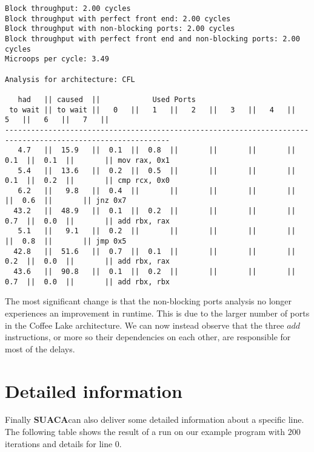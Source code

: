 \documentclass[a4paper,12pt,titlepage, twoside]{report}
\newcommand{\suaca}{\textbf{SUACA}}
\begin{document}
\begin{Verbatim}[fontsize=\scriptsize]
Block throughput: 2.00 cycles
Block throughput with perfect front end: 2.00 cycles
Block throughput with non-blocking ports: 2.00 cycles
Block throughput with perfect front end and non-blocking ports: 2.00 cycles
Microops per cycle: 3.49

Analysis for architecture: CFL

   had   || caused  ||            Used Ports
 to wait || to wait ||   0   ||   1   ||   2   ||   3   ||   4   ||   5   ||   6   ||   7   ||
------------------------------------------------------------------------------------------------------------
   4.7   ||  15.9   ||  0.1  ||  0.8  ||       ||       ||       ||  0.1  ||  0.1  ||       || mov rax, 0x1
   5.4   ||  13.6   ||  0.2  ||  0.5  ||       ||       ||       ||  0.1  ||  0.2  ||       || cmp rcx, 0x0
   6.2   ||   9.8   ||  0.4  ||       ||       ||       ||       ||       ||  0.6  ||       || jnz 0x7
  43.2   ||  48.9   ||  0.1  ||  0.2  ||       ||       ||       ||  0.7  ||  0.0  ||       || add rbx, rax
   5.1   ||   9.1   ||  0.2  ||       ||       ||       ||       ||       ||  0.8  ||       || jmp 0x5
  42.8   ||  51.6   ||  0.7  ||  0.1  ||       ||       ||       ||  0.2  ||  0.0  ||       || add rbx, rax
  43.6   ||  90.8   ||  0.1  ||  0.2  ||       ||       ||       ||  0.7  ||  0.0  ||       || add rbx, rbx
\end{Verbatim}

The most significant change is that the non-blocking ports analysis no longer experiences an improvement in runtime. This is due to the larger number of ports in the Coffee Lake architecture. We can now instead observe that the three $add$ instructions, or more so their dependencies on each other, are responsible for most of the delays. 




\section{Detailed information}
Finally \suaca can also deliver some detailed information about a specific line. The following table shows the result of a run on our example program with $200$ iterations and details for line $0$.
\end{document}
